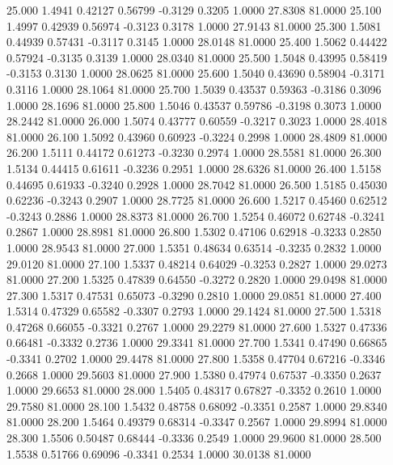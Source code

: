   25.000   1.4941   0.42127   0.56799  -0.3129   0.3205   1.0000  27.8308  81.0000
  25.100   1.4997   0.42939   0.56974  -0.3123   0.3178   1.0000  27.9143  81.0000
  25.300   1.5081   0.44939   0.57431  -0.3117   0.3145   1.0000  28.0148  81.0000
  25.400   1.5062   0.44422   0.57924  -0.3135   0.3139   1.0000  28.0340  81.0000
  25.500   1.5048   0.43995   0.58419  -0.3153   0.3130   1.0000  28.0625  81.0000
  25.600   1.5040   0.43690   0.58904  -0.3171   0.3116   1.0000  28.1064  81.0000
  25.700   1.5039   0.43537   0.59363  -0.3186   0.3096   1.0000  28.1696  81.0000
  25.800   1.5046   0.43537   0.59786  -0.3198   0.3073   1.0000  28.2442  81.0000
  26.000   1.5074   0.43777   0.60559  -0.3217   0.3023   1.0000  28.4018  81.0000
  26.100   1.5092   0.43960   0.60923  -0.3224   0.2998   1.0000  28.4809  81.0000
  26.200   1.5111   0.44172   0.61273  -0.3230   0.2974   1.0000  28.5581  81.0000
  26.300   1.5134   0.44415   0.61611  -0.3236   0.2951   1.0000  28.6326  81.0000
  26.400   1.5158   0.44695   0.61933  -0.3240   0.2928   1.0000  28.7042  81.0000
  26.500   1.5185   0.45030   0.62236  -0.3243   0.2907   1.0000  28.7725  81.0000
  26.600   1.5217   0.45460   0.62512  -0.3243   0.2886   1.0000  28.8373  81.0000
  26.700   1.5254   0.46072   0.62748  -0.3241   0.2867   1.0000  28.8981  81.0000
  26.800   1.5302   0.47106   0.62918  -0.3233   0.2850   1.0000  28.9543  81.0000
  27.000   1.5351   0.48634   0.63514  -0.3235   0.2832   1.0000  29.0120  81.0000
  27.100   1.5337   0.48214   0.64029  -0.3253   0.2827   1.0000  29.0273  81.0000
  27.200   1.5325   0.47839   0.64550  -0.3272   0.2820   1.0000  29.0498  81.0000
  27.300   1.5317   0.47531   0.65073  -0.3290   0.2810   1.0000  29.0851  81.0000
  27.400   1.5314   0.47329   0.65582  -0.3307   0.2793   1.0000  29.1424  81.0000
  27.500   1.5318   0.47268   0.66055  -0.3321   0.2767   1.0000  29.2279  81.0000
  27.600   1.5327   0.47336   0.66481  -0.3332   0.2736   1.0000  29.3341  81.0000
  27.700   1.5341   0.47490   0.66865  -0.3341   0.2702   1.0000  29.4478  81.0000
  27.800   1.5358   0.47704   0.67216  -0.3346   0.2668   1.0000  29.5603  81.0000
  27.900   1.5380   0.47974   0.67537  -0.3350   0.2637   1.0000  29.6653  81.0000
  28.000   1.5405   0.48317   0.67827  -0.3352   0.2610   1.0000  29.7580  81.0000
  28.100   1.5432   0.48758   0.68092  -0.3351   0.2587   1.0000  29.8340  81.0000
  28.200   1.5464   0.49379   0.68314  -0.3347   0.2567   1.0000  29.8994  81.0000
  28.300   1.5506   0.50487   0.68444  -0.3336   0.2549   1.0000  29.9600  81.0000
  28.500   1.5538   0.51766   0.69096  -0.3341   0.2534   1.0000  30.0138  81.0000
